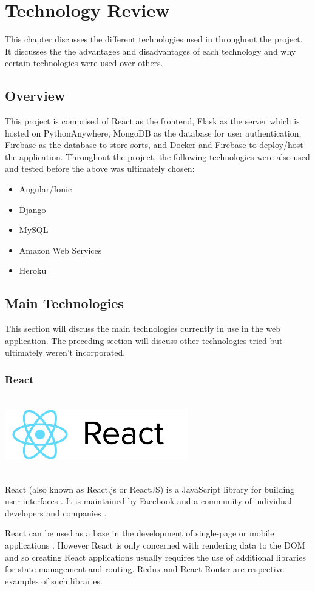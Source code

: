 \chapter{Technology Review}
This chapter discusses the different technologies used in throughout the
project. It discusses the the advantages and disadvantages of each technology 
and why certain technologies were used over others.

\section{Overview}
This project is comprised of React as the frontend, Flask as the server which is
hosted on PythonAnywhere, MongoDB as the database for user authentication, Firebase as the database to store sorts, and Docker and Firebase to deploy/host the application. Throughout the project, the following technologies were also used 
and tested before the above was ultimately chosen:
\begin{itemize}
    \item Angular/Ionic \cite{comparison}
    \item Django
    \item MySQL
    \item Amazon Web Services
    \item Heroku
\end{itemize}

\newpage
\section{Main Technologies}
This section will discuss the main technologies currently in use in the web 
application. The preceding section will discuss other technologies tried but 
ultimately weren't incorporated. 

\subsection{React}
\par
\medskip
\begin{center}
    \includegraphics[width=8cm,height=3.3cm,keepaspectratio]{images/react}
\end{center}
React (also known as React.js or ReactJS) is a JavaScript library for building 
user interfaces \cite{react_wiki}. It is maintained by Facebook and a community of individual 
developers and companies \cite{react_docs}.
\par
\bigskip
React can be used as a base in the development of single-page or mobile 
applications \cite{mod_dev}. However React is only concerned with rendering data to the DOM and
so creating React applications usually requires the use of additional libraries 
for state management and routing. Redux and React Router are respective examples
of such libraries. 

